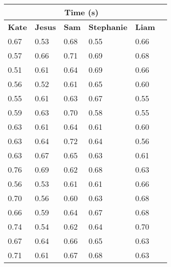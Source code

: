 \documentclass[11pt, letterpaper, includehead]{article}
\begin{document}
\begin{center}
  \begin{tabular}{|   m{2cm}  |  m{2cm}  |  m{2cm}  |  m{2cm}  |  m{2cm}  |  m{2cm}  | }
    \hline
    \multicolumn{5}{|c|}{\textbf{Time (s)}}\\
    \hline
    \textbf{Kate} & \textbf{Jesus} & \textbf{Sam} & \textbf{Stephanie} & \textbf{Liam} \\
    \hline
    0.67          & 0.53           & 0.68         & 0.55           & 0.66          \\
    \hline
    0.57          & 0.66           & 0.71         & 0.69           & 0.68          \\
    \hline
    0.51          & 0.61           & 0.64         & 0.69           & 0.66          \\
    \hline
    0.56          & 0.52           & 0.61         & 0.65           & 0.60          \\
    \hline
    0.55          & 0.61           & 0.63         & 0.67           & 0.55          \\
    \hline
    0.59          & 0.63           & 0.70         & 0.58           & 0.55          \\
    \hline
    0.63          & 0.61           & 0.64         & 0.61           & 0.60          \\
    \hline
    0.63          & 0.64           & 0.72         & 0.64           & 0.56          \\
    \hline
    0.63          & 0.67           & 0.65         & 0.63           & 0.61          \\
    \hline
    0.76          & 0.69           & 0.62         & 0.68           & 0.63          \\
    \hline
    0.56          & 0.53           & 0.61         & 0.61           & 0.66          \\
    \hline
    0.70          & 0.56           & 0.60         & 0.63           & 0.68          \\
    \hline
    0.66          & 0.59           & 0.64         & 0.67           & 0.68          \\
    \hline
    0.74          & 0.54           & 0.62         & 0.64           & 0.70          \\
    \hline
    0.67          & 0.64           & 0.66         & 0.65           & 0.63          \\
    \hline
    0.71          & 0.61           & 0.67         & 0.68           & 0.63          \\

\end{tabular}
\end{center}
\end{document}
